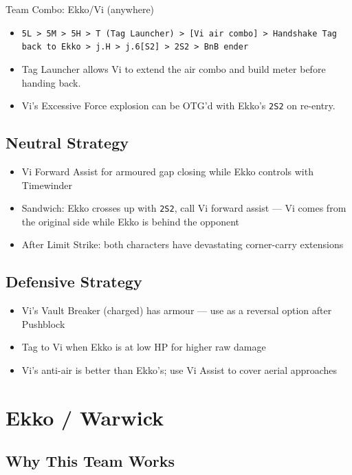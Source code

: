 \documentclass[12pt, a4paper]{report}
\newcommand{\notation}[1]{{\small\texttt{\textcolor{ekkoBlue}{#1}}}}
\begin{document}
\begin{combobox}[]{Team Combo: Ekko/Vi (anywhere)}
\begin{itemize}
  \item \notation{5L > 5M > 5H > T (Tag Launcher) > [Vi air combo] > Handshake Tag back to Ekko > j.H > j.6[S2] > 2S2 > BnB ender}
  \item Tag Launcher allows Vi to extend the air combo and build meter before handing back.
  \item Vi's Excessive Force explosion can be OTG'd with Ekko's \notation{2S2} on re-entry.
\end{itemize}
\end{combobox}

\subsection{Neutral Strategy}

\begin{itemize}
  \item Vi Forward Assist for armoured gap closing while Ekko controls with Timewinder
  \item Sandwich: Ekko crosses up with \notation{2S2}, call Vi forward assist --- Vi comes from the original side while Ekko is behind the opponent
  \item After Limit Strike: both characters have devastating corner-carry extensions
\end{itemize}

\subsection{Defensive Strategy}

\begin{itemize}
  \item Vi's Vault Breaker (charged) has armour --- use as a reversal option after Pushblock
  \item Tag to Vi when Ekko is at low HP for higher raw damage
  \item Vi's anti-air is better than Ekko's; use Vi Assist to cover aerial approaches
\end{itemize}

\section{Ekko / Warwick}

\subsection{Why This Team Works}
\end{document}
